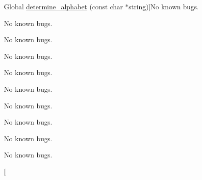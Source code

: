 \begin{DoxyRefList}
\hypertarget{bug__bug000131}{}%
\-Global \hyperlink{utils_8c_ad73b9e1214ba189b383a04fa6b964028}{determine\-\_\-alphabet} (const char $\ast$string)]\-No known bugs.  
\item[\label{bug__bug000149}%
\hypertarget{bug__bug000149}{}%
\-Global \hyperlink{wavelet__tree_8c_a2bce515c362e564783e01ea820b3dc1b}{determine\-\_\-substrings} (const \hyperlink{structwavelet__tree}{wavelet\-\_\-tree} $\ast$tree, unsigned int parent, char $\ast$$\ast$string\-\_\-arr, const char $\ast$string)]\-No known bugs.  
\item[\label{bug__bug000005}%
\hypertarget{bug__bug000005}{}%
\-Global \hyperlink{distinct__substrings_8c_ac89231add0184a22b253fe71ed8f15d6}{distinct\-\_\-substrings} (char $\ast$string)]\-No known bugs.  
\item[\label{bug__bug000001}%
\hypertarget{bug__bug000001}{}%
\-File \hyperlink{distinct__substrings_8c}{distinct\-\_\-substrings.c} ]\-No known bugs. 
\item[\label{bug__bug000084}%
\hypertarget{bug__bug000084}{}%
\-Global \hyperlink{iterate_8h_a9c0e60a22bdd79bdf9aca03ab2b4020f}{double\-\_\-iterate} (\hyperlink{iterate_8h_structiterator__state}{iterator\-\_\-state} $\ast$state, void($\ast$callback)(\hyperlink{iterate_8h_structiterator__state}{iterator\-\_\-state} $\ast$state, void $\ast$results), void $\ast$result)]\-No known bugs.  
\item[\label{bug__bug000093}%
\hypertarget{bug__bug000093}{}%
\-Global \hyperlink{substring__stack_8c_abf54044f739b429150323ed4a0173be4}{double\-\_\-size} (\hyperlink{substring__stack_8h_structsubstring__stack}{substring\-\_\-stack} $\ast$stack)]\-No known bugs.  
\item[\label{bug__bug000020}%
\hypertarget{bug__bug000020}{}%
\-Global \hyperlink{draw__tree_8h_ad7157b2c81e9f0c8a0af5a8c5d65303c}{draw\-\_\-suffix\-\_\-tree} (char $\ast$string, char $\ast$filename)]\-No known bugs.  
\item[\label{bug__bug000006}%
\hypertarget{bug__bug000006}{}%
\-File \hyperlink{draw__tree_8c}{draw\-\_\-tree.c} ]\-No known bugs.  
\item[\label{bug__bug000019}%
\hypertarget{bug__bug000019}{}%
\-File \hyperlink{draw__tree_8h}{draw\-\_\-tree.h} ]\-No known bugs.  
\item[\label{bug__bug000010}%
\hypertarget{bug__bug000010}{}%
\-Global \hyperlink{draw__tree_8c_a3f27aa589c60b7c6a07facd496516b66}{find\-\_\-node\-\_\-by\-\_\-substring} (substring $\ast$substr, internal\-\_\-node $\ast$root)]\-No known bugs.  
\item[\label{bug__bug000109}%
$$
\end{DoxyRefList}
